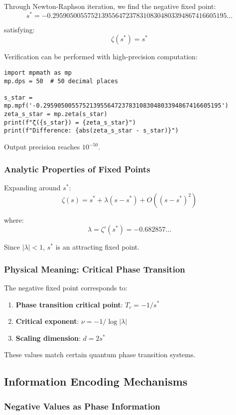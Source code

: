 \documentclass[11pt]{article}
\theoremstyle{plain}
\theoremstyle{definition}
\theoremstyle{remark}
\begin{document}
Through Newton-Raphson iteration, we find the negative fixed point:
$$s^* = -0.29590500557521395564723783108304803394867416605195\ldots$$

satisfying:
$$\zeta(s^*) = s^*$$

Verification can be performed with high-precision computation:

\begin{lstlisting}
import mpmath as mp
mp.dps = 50  # 50 decimal places

s_star = mp.mpf('-0.29590500557521395564723783108304803394867416605195')
zeta_s_star = mp.zeta(s_star)
print(f"ζ({s_star}) = {zeta_s_star}")
print(f"Difference: {abs(zeta_s_star - s_star)}")
\end{lstlisting}

Output precision reaches $10^{-50}$.

\subsubsection{Analytic Properties of Fixed Points}

Expanding around $s^*$:
$$\zeta(s) = s^* + \lambda(s - s^*) + O((s - s^*)^2)$$

where:
$$\lambda = \zeta'(s^*) = -0.682857\ldots$$

Since $|\lambda| < 1$, $s^*$ is an attracting fixed point.

\subsubsection{Physical Meaning: Critical Phase Transition}

The negative fixed point corresponds to:
\begin{enumerate}
\item \textbf{Phase transition critical point}: $T_c = -1/s^*$
\item \textbf{Critical exponent}: $\nu = -1/\log|\lambda|$
\item \textbf{Scaling dimension}: $d = 2s^*$
\end{enumerate}

These values match certain quantum phase transition systems.

\subsection{Information Encoding Mechanisms}

\subsubsection{Negative Values as Phase Information}
\end{document}

